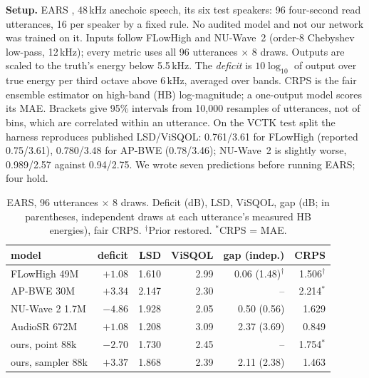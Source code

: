 \documentclass[letterpaper]{article} %
\begin{document}
\textbf{Setup.} EARS \citep{richter2024}, 48\,kHz anechoic speech, its six test speakers: 96 four-second
read utterances, 16 per speaker by a fixed rule. No audited model and not our network was trained on it.
Inputs follow FLowHigh and NU-Wave~2 (order-8 Chebyshev low-pass, 12\,kHz); every metric uses all 96
utterances $\times$ 8 draws. Outputs are scaled to the truth's energy below 5.5\,kHz. The \emph{deficit} is
$10\log_{10}$ of output over true energy per third octave above 6\,kHz, averaged over bands. CRPS is the
fair ensemble estimator on high-band (HB) log-magnitude; a one-output model scores its MAE. Brackets give
95\% intervals from 10{,}000 resamples of utterances, not of bins, which are correlated within an
utterance. On the VCTK test split the harness reproduces published LSD/ViSQOL: 0.761/3.61 for FLowHigh
(reported 0.75/3.61), 0.780/3.48 for AP-BWE \citep{lu2024} (0.78/3.46); NU-Wave~2 is slightly worse,
0.989/2.57 against 0.94/2.75. We wrote seven predictions before running EARS; four hold.

\begin{table}[t]
\centering\small\setlength{\tabcolsep}{2.4pt}
\begin{tabular}{lrrrrr}
\toprule
model & deficit & LSD & ViSQOL & gap (indep.) & CRPS \\
\midrule
FLowHigh 49M & $+1.08$ & 1.610 & 2.99 & 0.06 (1.48)$^\dagger$ & 1.506$^\dagger$ \\
AP-BWE 30M & $+3.34$ & 2.147 & 2.30 & -- & 2.214$^*$ \\
NU-Wave 2 1.7M & $-4.86$ & 1.928 & 2.05 & 0.50 (0.56) & 1.629 \\
AudioSR 672M & $+1.08$ & 1.208 & 3.09 & 2.37 (3.69) & 0.849 \\
ours, point 88k & $-2.70$ & 1.730 & 2.45 & -- & 1.754$^*$ \\
ours, sampler 88k & $+3.37$ & 1.868 & 2.39 & 2.11 (2.38) & 1.463 \\
\bottomrule
\end{tabular}
\caption{EARS, 96 utterances $\times$ 8 draws. Deficit (dB), LSD, ViSQOL, gap (dB; in parentheses,
independent draws at each utterance's measured HB energies), fair CRPS. $^\dagger$Prior restored.
$^*$CRPS = MAE.}
\label{tab:released}
\end{table}
\end{document}
